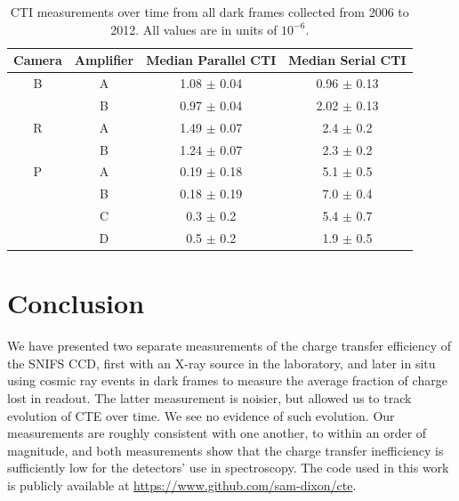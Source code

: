 \begin{table}[htbp]
    \centering
    \begin{tabular}{cccc}\toprule
        Camera & Amplifier & Median Parallel CTI  & Median Serial CTI \\ \midrule
        B & A &   1.08 $\pm$ 0.04  &  0.96 $\pm$ 0.13 \\
          & B &   0.97 $\pm$ 0.04  &  2.02 $\pm$ 0.13 \\\midrule
        R & A &   1.49 $\pm$ 0.07  &  2.4  $\pm$ 0.2 \\
          & B &   1.24 $\pm$ 0.07  &  2.3  $\pm$ 0.2 \\\midrule
        P & A &   0.19 $\pm$ 0.18  &  5.1  $\pm$ 0.5 \\
          & B &   0.18 $\pm$ 0.19  &  7.0  $\pm$ 0.4 \\
          & C &   0.3  $\pm$ 0.2   &  5.4  $\pm$ 0.7 \\
          & D &   0.5  $\pm$ 0.2   &  1.9  $\pm$ 0.5 \\\midrule
    \end{tabular}
    \caption{CTI measurements over time from all dark frames collected from 2006 to 2012. All values are in units of $10^{-6}$.}
    \label{tab:cte_darks}
\end{table}

\section{Conclusion}
We have presented two separate measurements of the charge transfer efficiency of the SNIFS CCD, first with an X-ray source in the laboratory, and later in situ using cosmic ray events in dark frames to measure the average fraction of charge lost in readout. The latter measurement is noisier, but allowed us to track evolution of CTE over time. We see no evidence of such evolution. Our measurements are roughly consistent with one another, to within an order of magnitude, and both measurements show that the charge transfer inefficiency is sufficiently low for the detectors' use in spectroscopy. The code used in this work is publicly available at \url{https://www.github.com/sam-dixon/cte}.


